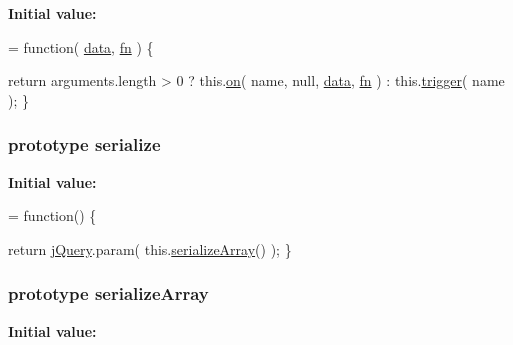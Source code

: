 {\bfseries Initial value\-:}
\begin{DoxyCode}
= \textcolor{keyword}{function}( \hyperlink{jquery-1_810_82-vsdoc_8js_a609407b3456fdc3c5671a9fc4a226ff7}{data}, \hyperlink{jquery-1_810_82-vsdoc_8js_acef6bdaf6b9b20fdcca1ea86f0902c3b}{fn} ) \{


        \textcolor{keywordflow}{return} arguments.length > 0 ?
            this.\hyperlink{jquery-1_810_82-vsdoc_8js_ae453b412b883f60220d73468ef6c6dbc}{on}( name, null, \hyperlink{jquery-1_810_82-vsdoc_8js_a609407b3456fdc3c5671a9fc4a226ff7}{data}, \hyperlink{jquery-1_810_82-vsdoc_8js_acef6bdaf6b9b20fdcca1ea86f0902c3b}{fn} ) :
            this.\hyperlink{jquery-1_810_82-vsdoc_8js_a2388c4114d5e3e4eab020f973641519c}{trigger}( name );
    \}
\end{DoxyCode}
\hypertarget{jquery-1_810_82-vsdoc_8js_a4df62e04698a766c2951740e57243503}{
\subsubsection[{serialize}]{ {\bf prototype} serialize}}\label{jquery-1_810_82-vsdoc_8js_a4df62e04698a766c2951740e57243503}
{\bfseries Initial value\-:}
\begin{DoxyCode}
= \textcolor{keyword}{function}() \{


        \textcolor{keywordflow}{return} \hyperlink{jquery-1_810_82-vsdoc_8js_add5237586d970a38a81f990e8eb28c6c}{jQuery}.param( this.\hyperlink{jquery-1_810_82-vsdoc_8js_a0ba7b24b29b3762704d7b7da11b98315}{serializeArray}() );
    \}
\end{DoxyCode}
\hypertarget{jquery-1_810_82-vsdoc_8js_a0ba7b24b29b3762704d7b7da11b98315}{
\subsubsection[{serialize\-Array}]{ {\bf prototype} serialize\-Array}}\label{jquery-1_810_82-vsdoc_8js_a0ba7b24b29b3762704d7b7da11b98315}
{\bfseries Initial value\-:}
